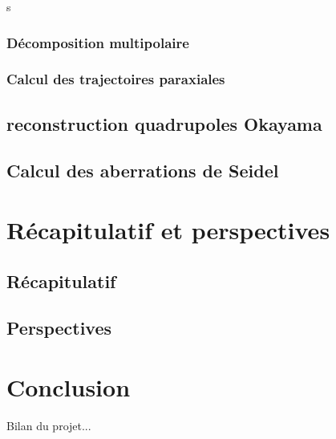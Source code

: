 s\documentclass{report}
\begin{document}
\subsection{Décomposition multipolaire}

\subsection{Calcul des trajectoires paraxiales}

\section{reconstruction quadrupoles Okayama}

\section{Calcul des aberrations de Seidel}

\chapter{Récapitulatif et perspectives}
\section{Récapitulatif}
\section{Perspectives}

\chapter*{Conclusion}
Bilan du projet...

\newpage
\listoffigures
{}

\listoftables
{}

\newpage


\end{document}
